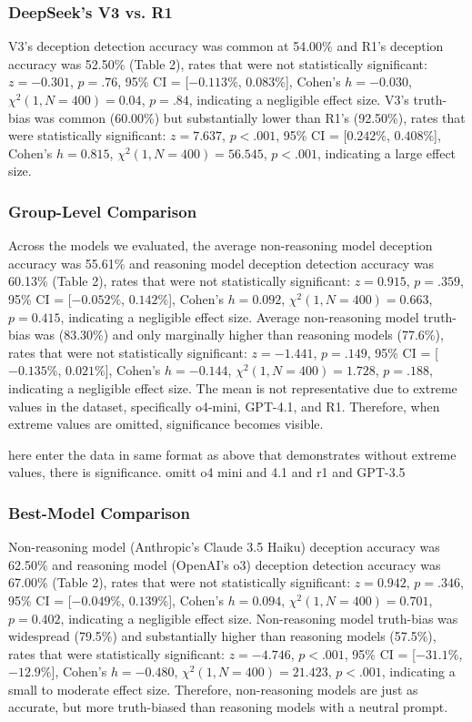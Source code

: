 \documentclass{article}
\begin{document}
\subsubsection{DeepSeek's V3 vs. R1}

V3's deception detection accuracy was common at 54.00\% and R1's deception accuracy was 52.50\% (Table 2), rates that were not statistically significant:  $z = -0.301$, $p = .76$, 95\% CI = [$-0.113\%$, $0.083\%$], Cohen’s $h =-0.030$, $\chi^2(1, N = 400) = 0.04$, $p = .84$, indicating a negligible effect size. V3's truth-bias was common (60.00\%) but substantially lower than R1's (92.50\%), rates that were statistically significant: $z = 7.637$, $p < .001$, 95\% CI = [$0.242\%$, $0.408\%$], Cohen’s $h = 0.815$, $\chi^2(1, N = 400) = 56.545$, $p < .001$, indicating a large effect size.

\subsubsection{Group-Level Comparison}

Across the models we evaluated, the average non-reasoning model deception accuracy was 55.61\% and reasoning model deception detection accuracy was 60.13\% (Table 2), rates that were not statistically significant:  $z = 0.915$, $p = .359$, 95\% CI = [$-0.052\%$, $0.142\%$], Cohen’s $h = 0.092$, $\chi^2(1, N = 400) = 0.663$, $p = 0.415$, indicating a negligible effect size. Average non-reasoning model truth-bias was (83.30\%) and only marginally higher than reasoning models (77.6\%), rates that were not statistically significant: $z = -1.441$, $p = .149$, 95\% CI = [$-0.135\%$, $0.021\%$], Cohen’s $h = -0.144$, $\chi^2(1, N = 400) = 1.728$, $p = .188$, indicating a negligible effect size. The mean is not representative due to extreme values in the dataset, specifically o4-mini, GPT-4.1, and R1. Therefore, when extreme values are omitted, significance becomes visible. 

here enter the data in same format as above that demonstrates without extreme values, there is significance. omitt o4 mini and 4.1 and r1 and GPT-3.5 

\subsubsection{Best-Model Comparison}

Non-reasoning model (Anthropic’s Claude 3.5 Haiku) deception accuracy was 62.50\% and reasoning model (OpenAI's o3) deception detection accuracy was 67.00\% (Table 2), rates that were not statistically significant:  $z = 0.942$, $p = .346$, 95\% CI = [$-0.049\%$, $0.139\%$], Cohen’s $h = 0.094$, $\chi^2(1, N = 400) = 0.701$, $p = 0.402$, indicating a negligible effect size. Non-reasoning model truth-bias was widespread (79.5\%) and substantially higher than reasoning models (57.5\%), rates that were statistically significant: $z = -4.746$, $p < .001$, 95\% CI = [$-31.1\%$, $-12.9\%$], Cohen’s $h = -0.480$, $\chi^2(1, N = 400) = 21.423$, $p < .001$, indicating a small to moderate effect size. Therefore, non-reasoning models are just as accurate, but more truth-biased than reasoning models with a neutral prompt. 
\end{document}
